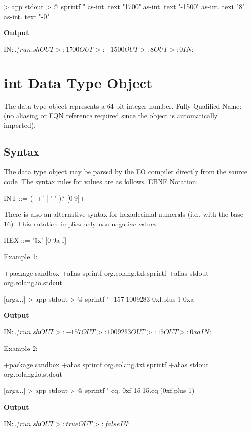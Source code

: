 \documentclass[12pt]{book}
\begin{document}
{\begin{ffcode}
[args...] > app
  stdout > @
    sprintf
      "%
    as-int.
      text "1700"
    as-int.
      text "-1500"
    as-int.
      text "8"
    as-int.
      text "-0"
\end{ffcode}
\textbf{Output}
\begin{ffcode}
IN$: ./run.sh
OUT>: 1700
OUT>: -1500
OUT>: 8
OUT>: 0
IN$: 
\end{ffcode}

\section{int Data Type Object}
The  data type object represents a 64-bit integer number.
Fully Qualified Name:  (no aliasing or FQN reference required since the object is automatically imported).

\subsection{Syntax}
The  data type object may be parsed by the EO compiler directly from the source code. The syntax rules for values are as follows. EBNF Notation:

\begin{ffcode}
INT      ::= ( '+' | '-' )? [0-9]+
\end{ffcode}
There is also an alternative syntax for hexadecimal numerals (i.e., with the base 16). This notation implies only non-negative values.

\begin{ffcode}
HEX      ::= '0x' [0-9a-f]+
\end{ffcode}
Example 1:
\begin{ffcode}
+package sandbox
+alias sprintf org.eolang.txt.sprintf
+alias stdout org.eolang.io.stdout

[args...] > app
  stdout > @
    sprintf
      "%
      -157
      1009283
      0xf.plus 1
      0xa
\end{ffcode}
\textbf{Output}
\begin{ffcode}
IN$: ./run.sh
OUT>: -157
OUT>: 1009283
OUT>: 16
OUT>: 0xa
IN$: 
\end{ffcode}
Example 2:
\begin{ffcode}
+package sandbox
+alias sprintf org.eolang.txt.sprintf
+alias stdout org.eolang.io.stdout
    
[args...] > app
  stdout > @
  sprintf
    "%
    eq.
      0xf
      15
    15.eq (0xf.plus 1)
\end{ffcode}
\textbf{Output}
\begin{ffcode}
IN$: ./run.sh
OUT>: true
OUT>: false
IN$: 
\end{ffcode}

}
\end{document}
